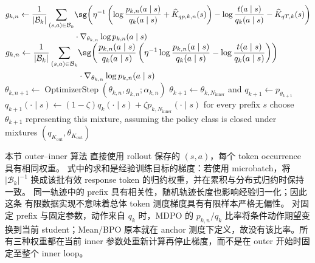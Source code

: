 \begin{algorithm}[ht]
\begin{algorithmic}[1]
            \State $\begin{aligned}g_{k,n}\gets\frac1{|\mathcal B_k|}\sum_{(s,a)\in\mathcal B_k}&\sg\!\left(\eta^{-1}\left(\log\frac{p_{k,n}(a\mid s)}{q_k(a\mid s)}+\widehat K_{qp,k,n}(s)\right)-\log\frac{t(a\mid s)}{q_k(a\mid s)}-\widehat K_{qT,k}(s)\right)\\&{}\cdot\nabla_{\theta_{k,n}}\log p_{k,n}(a\mid s)\end{aligned}$
            \State $\begin{aligned}g_{k,n}\gets\frac1{|\mathcal B_k|}\sum_{(s,a)\in\mathcal B_k}&\sg\!\left(\frac{p_{k,n}(a\mid s)}{q_k(a\mid s)}\left(\eta^{-1}\log\frac{p_{k,n}(a\mid s)}{q_k(a\mid s)}-\log\frac{t(a\mid s)}{q_k(a\mid s)}\right)\right)\\&{}\cdot\nabla_{\theta_{k,n}}\log p_{k,n}(a\mid s)\end{aligned}$
        \EndIf
        \State $\theta_{k,n+1}\gets\operatorname{OptimizerStep}(\theta_{k,n},g_{k,n};\alpha_{k,n})$ 
    \EndFor
        \State $\theta_{k+1}\gets\theta_{k,N_{\mathrm{inner}}}$ and $q_{k+1}\gets p_{\theta_{k+1}}$
    \Else
        \State $q_{k+1}(\cdot\mid s)\gets(1-\zeta)q_k(\cdot\mid s)+\zeta p_{k,N_{\mathrm{inner}}}(\cdot\mid s)$ for every prefix $s$
        \State choose $\theta_{k+1}$ representing this mixture, assuming the policy class is closed under mixtures 
    \EndIf
\EndFor
\State \Return $(q_{K_{\mathrm{out}}},\theta_{K_{\mathrm{out}}})$
\end{algorithmic}
\end{algorithm}

本节 outer--inner 算法 直接使用 rollout 保存的 $(s,a)$，每个 token occurrence 具有相同权重。 式中的求和是经验训练目标的梯度：若使用 microbatch，将 $|\mathcal B_k|^{-1}$ 换成该批有效 response token 的归约权重，并在累积与分布式归约时保持一致。 同一轨迹中的 prefix 具有相关性，随机轨迹长度也影响经验归一化；因此这条 有限数据实现不意味着总体 token 测度梯度具有有限样本严格无偏性。 对固定 prefix 与固定参数，动作来自 $q_k$ 时，MDPO 的 $p_{k,n}/q_k$ 比率将条件动作期望变换到当前 student；Mean/BPO 原本就在 anchor 测度下定义，故没有该比率。所有三种权重都在当前 inner 参数处重新计算再停止梯度，而不是在 outer 开始时固定至整个 inner loop。

